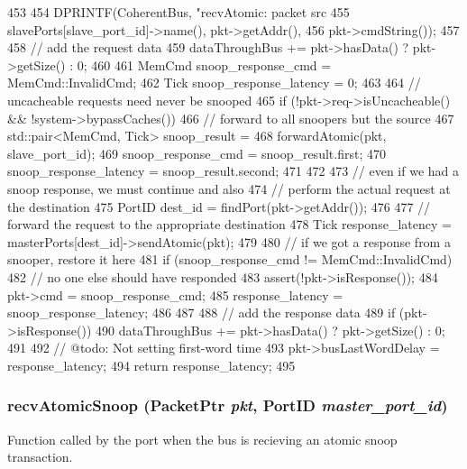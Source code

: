 \begin{DoxyCode}
453 {
454     DPRINTF(CoherentBus, "recvAtomic: packet src %
455             slavePorts[slave_port_id]->name(), pkt->getAddr(),
456             pkt->cmdString());
457 
458     // add the request data
459     dataThroughBus += pkt->hasData() ? pkt->getSize() : 0;
460 
461     MemCmd snoop_response_cmd = MemCmd::InvalidCmd;
462     Tick snoop_response_latency = 0;
463 
464     // uncacheable requests need never be snooped
465     if (!pkt->req->isUncacheable() && !system->bypassCaches()) {
466         // forward to all snoopers but the source
467         std::pair<MemCmd, Tick> snoop_result =
468             forwardAtomic(pkt, slave_port_id);
469         snoop_response_cmd = snoop_result.first;
470         snoop_response_latency = snoop_result.second;
471     }
472 
473     // even if we had a snoop response, we must continue and also
474     // perform the actual request at the destination
475     PortID dest_id = findPort(pkt->getAddr());
476 
477     // forward the request to the appropriate destination
478     Tick response_latency = masterPorts[dest_id]->sendAtomic(pkt);
479 
480     // if we got a response from a snooper, restore it here
481     if (snoop_response_cmd != MemCmd::InvalidCmd) {
482         // no one else should have responded
483         assert(!pkt->isResponse());
484         pkt->cmd = snoop_response_cmd;
485         response_latency = snoop_response_latency;
486     }
487 
488     // add the response data
489     if (pkt->isResponse())
490         dataThroughBus += pkt->hasData() ? pkt->getSize() : 0;
491 
492     // @todo: Not setting first-word time
493     pkt->busLastWordDelay = response_latency;
494     return response_latency;
495 }
\end{DoxyCode}
\hypertarget{classCoherentBus_a533893555a1e2a7727e380a4747c33fb}{
\subsubsection[{recvAtomicSnoop}]{ recvAtomicSnoop ({\bf PacketPtr} {\em pkt}, \/  {\bf PortID} {\em master\_\-port\_\-id})}}
\label{classCoherentBus_a533893555a1e2a7727e380a4747c33fb}
Function called by the port when the bus is recieving an atomic snoop transaction. 


